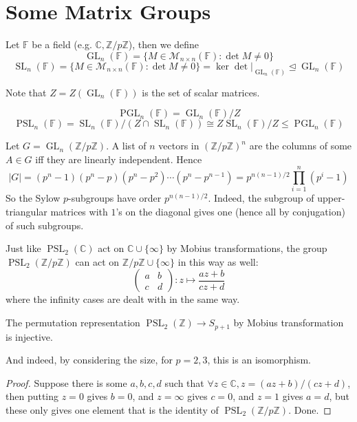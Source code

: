 \section{Some Matrix Groups}
\begin{definition}
    Let $\mathbb F$ be a field (e.g. $\mathbb C,\mathbb Z/p\mathbb Z$), then we define
    $$\operatorname{GL}_n(\mathbb F)=\{M\in\mathcal M_{n\times n}(\mathbb F):\det M\neq 0\}$$
    $$\operatorname{SL}_n(\mathbb F)=\{M\in\mathcal M_{n\times n}(\mathbb F):\det M\neq 0\}=\ker\det|_{\operatorname{GL}_n(\mathbb F)}\unlhd\operatorname{GL}_n(\mathbb F)$$
\end{definition}
Note that $Z=Z(\operatorname{GL}_n(\mathbb F))$ is the set of scalar matrices.
\begin{definition}
    $$\operatorname{PGL}_n(\mathbb F)=\operatorname{GL}_n(\mathbb F)/Z$$
    $$\operatorname{PSL}_n(\mathbb F)=\operatorname{SL}_n(\mathbb F)/(Z\cap \operatorname{SL}_n(\mathbb F))\cong Z\operatorname{SL}_n(\mathbb F)/Z\le\operatorname{PGL}_n(\mathbb F)$$
\end{definition}
\begin{example}
    Let $G=\operatorname{GL}_n(\mathbb Z/p\mathbb Z)$.
    A list of $n$ vectors in $(\mathbb Z/p\mathbb Z)^n$ are the columns of some $A\in G$ iff they are linearly independent.
    Hence
    $$|G|=(p^n-1)(p^n-p)(p^n-p^2)\cdots (p^n-p^{n-1})=p^{n(n-1)/2}\prod_{i=1}^n(p^i-1)$$
    So the Sylow $p$-subgroups have order $p^{n(n-1)/2}$.
    Indeed, the subgroup of upper-triangular matrices with $1$'s on the diagonal gives one (hence all by conjugation) of such subgroups.
\end{example}
Just like $\operatorname{PSL}_2(\mathbb C)$ act on $\mathbb C\cup\{\infty\}$ by Mobius transformations, the group $\operatorname{PSL}_2(\mathbb Z/p\mathbb Z)$ can act on $\mathbb Z/p\mathbb Z\cup\{\infty\}$ in this way as well:
$$\begin{pmatrix}
    a&b\\
    c&d
\end{pmatrix}:z\mapsto\frac{az+b}{cz+d}$$
where the infinity cases are dealt with in the same way.
\begin{lemma}\label{psl_mobius}
    The permutation representation $\operatorname{PSL}_2(\mathbb Z)\to S_{p+1}$ by Mobius transformation is injective.
\end{lemma}
And indeed, by considering the size, for $p=2,3$, this is an isomorphism.
\begin{proof}
    Suppose there is some $a,b,c,d$ such that $\forall z\in\mathbb C,z=(az+b)/(cz+d)$, then putting $z=0$ gives $b=0$, and $z=\infty$ gives $c=0$, and $z=1$ gives $a=d$, but these only gives one element that is the identity of $\operatorname{PSL}_2(\mathbb Z/p\mathbb Z)$.
    Done.
\end{proof}
